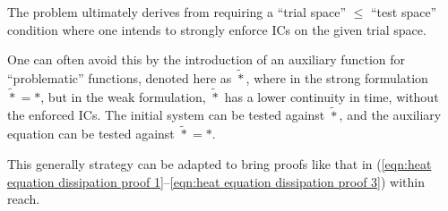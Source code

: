     The problem ultimately derives from requiring a ``trial space'' $\leqslant$ ``test space'' condition where one intends to strongly enforce ICs on the given trial space.

    One can often avoid this by the introduction of an auxiliary function for ``problematic'' functions, denoted here as $\widetilde{*}$, where in the strong formulation $\widetilde{*}  =  *$, but in the weak formulation, $\widetilde{*}$ has a lower continuity in time, without the enforced ICs. The initial system can be tested against $\widetilde{*}$, and the auxiliary equation can be tested against $\widetilde{*}  =  *$.

    This generally strategy can be adapted to bring proofs like that in (\ref{eqn:heat equation dissipation proof 1}–\ref{eqn:heat equation dissipation proof 3}) within reach.



    